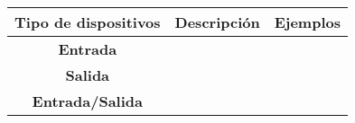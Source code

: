\begin{center}
    \begin{tabular}{|c|c|c|}
        \hline
        \textbf{Tipo de dispositivos} & \textbf{Descripción} & \textbf{Ejemplos} \\
        \hline
        \textbf{Entrada} & & \\
        \hline
        \textbf{Salida} & & \\
        \hline
        \textbf{Entrada/Salida} & & \\
        \hline
    \end{tabular}
\end{center}